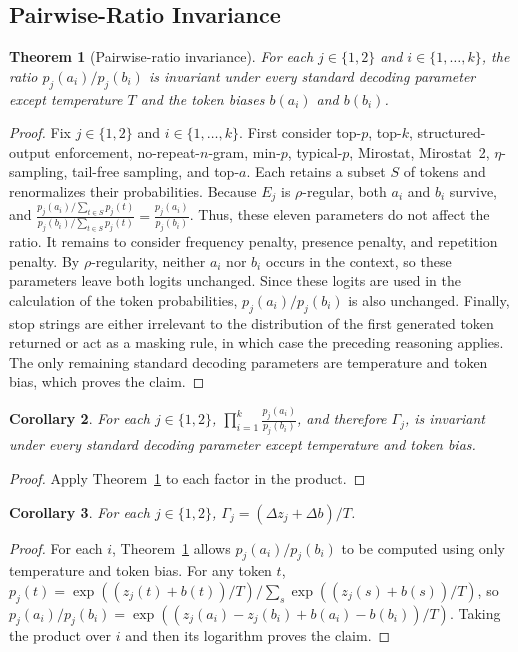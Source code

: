 \documentclass{article}
\newtheorem{theorem}{Theorem}
\newtheorem{corollary}[theorem]{Corollary}
\begin{document}
\subsection{Pairwise-Ratio Invariance}

\begin{theorem}[Pairwise-ratio invariance]
\label{thm:pairwise-ratio-invariance}
For each $j\in\{1,2\}$ and $i\in\{1,\ldots,k\}$, the ratio
$p_j(a_i)/p_j(b_i)$ is invariant under every standard decoding parameter
except temperature $T$ and the token biases $b(a_i)$ and $b(b_i)$.
\end{theorem}
\begin{proof}
Fix $j\in\{1,2\}$ and $i\in\{1,\ldots,k\}$. First consider top-$p$,
top-$k$, structured-output enforcement, no-repeat-$n$-gram, min-$p$,
typical-$p$, Mirostat, Mirostat~2, $\eta$-sampling, tail-free sampling, and
top-$a$. Each retains a subset $S$ of tokens and renormalizes their
probabilities. Because $E_j$ is $\rho$-regular, both $a_i$ and $b_i$ survive,
and $\frac{p_j(a_i)/\sum_{t\in S}p_j(t)}
{p_j(b_i)/\sum_{t\in S}p_j(t)}=\frac{p_j(a_i)}{p_j(b_i)}$. Thus, these eleven
parameters do not affect the ratio.
It remains to consider frequency penalty, presence penalty, and repetition
penalty. By $\rho$-regularity, neither $a_i$ nor $b_i$ occurs in the context,
so these parameters leave both logits unchanged. Since these logits are used in
the calculation of the token probabilities, $p_j(a_i)/p_j(b_i)$ is also unchanged.
Finally, stop strings are either irrelevant to the distribution of the first
generated token returned or act as a masking rule, in which case the preceding
reasoning applies.
The only remaining standard decoding parameters are temperature and token bias,
which proves the claim.
\end{proof}

\begin{corollary}
\label{cor:product-ratio-invariance}
For each $j\in\{1,2\}$, $\prod_{i=1}^{k}\frac{p_j(a_i)}{p_j(b_i)}$, and
therefore $\Gamma_j$, is invariant under every standard decoding parameter
except temperature and token bias.
\end{corollary}
\begin{proof}
Apply Theorem~\ref{thm:pairwise-ratio-invariance} to each factor in the product.
\end{proof}

\begin{corollary}
\label{cor:untampered-affine-identity}
For each $j\in\{1,2\}$, $\Gamma_j=(\Delta z_j+\Delta b)/T$.
\end{corollary}
\begin{proof}
For each $i$, Theorem~\ref{thm:pairwise-ratio-invariance} allows
$p_j(a_i)/p_j(b_i)$ to be computed using only temperature and token bias.
For any token $t$,
$p_j(t)=\exp((z_j(t)+b(t))/T)/\sum_s\exp((z_j(s)+b(s))/T)$, so
$p_j(a_i)/p_j(b_i)=\exp((z_j(a_i)-z_j(b_i)+b(a_i)-b(b_i))/T)$.
Taking the product over $i$ and then its logarithm proves the claim.
\end{proof}
\end{document}
